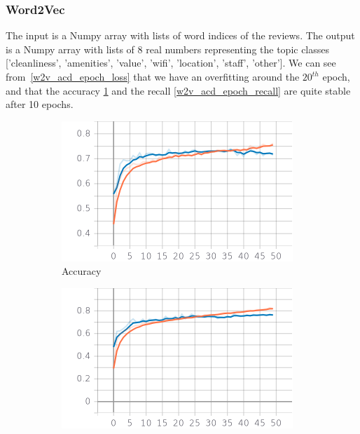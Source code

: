 \documentclass{article}
\begin{document}
            \subsubsection{Word2Vec}
                The input is a Numpy array with lists of word indices of the reviews.
                The output is a Numpy array with lists of 8 real numbers representing the topic classes ['cleanliness', 'amenities', 'value', 'wifi', 'location', 'staff', 'other'].
                We can see from~\ref{w2v_acd_epoch_loss} that we have an overfitting around the $20^{th}$ epoch, and that the accuracy \ref{w2v_acd_epoch_accuracy} and the recall \ref{w2v_acd_epoch_recall} are quite stable after 10 epochs.
            \begin{figure}
		    \centering
		        \begin{subfigure}{.33\textwidth}
  		            \centering
 		            \includegraphics[width=\textwidth]{imgs/plots/w2v_acd_epoch_accuracy.png}
  		            \caption{Accuracy}
  		            \label{w2v_acd_epoch_accuracy}
		        \end{subfigure}%
                \begin{subfigure}{.33\textwidth}
 		            \centering
 		            \includegraphics[width=\textwidth]{imgs/plots/w2v_acd_epoch_recall.png}

\end{subfigure}
\end{figure}
\end{document}

